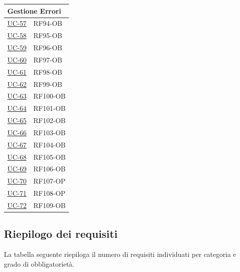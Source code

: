 ﻿\documentclass[a4paper,12pt]{article}
\begin{document}
{\begin{longtable}{|p{4cm}|p{4cm}|}
    \multicolumn{2}{|l|}{\cellcolor{gray!12}\textbf{Gestione Errori}} \\
    \hline
    \hyperref[errore-uc-57]{UC-57} & RF94-OB \\
    \hline
    \hyperref[errore-uc-58]{UC-58} & RF95-OB \\
    \hline
    \hyperref[errore-uc-59]{UC-59} & RF96-OB \\
    \hline
    \hyperref[errore-uc-60]{UC-60} & RF97-OB \\
    \hline
    \hyperref[errore-uc-61]{UC-61} & RF98-OB \\
    \hline
    \hyperref[errore-uc-62]{UC-62} & RF99-OB \\
    \hline
    \hyperref[errore-uc-63]{UC-63} & RF100-OB \\
    \hline
    \hyperref[errore-uc-64]{UC-64} & RF101-OB \\
    \hline
    \hyperref[errore-uc-65]{UC-65} & RF102-OB \\
    \hline
    \hyperref[errore-uc-66]{UC-66} & RF103-OB \\
    \hline
    \hyperref[errore-uc-67]{UC-67} & RF104-OB \\
    \hline
    \hyperref[errore-uc-68]{UC-68} & RF105-OB \\
    \hline
    \hyperref[errore-uc-69]{UC-69} & RF106-OB \\
    \hline
    \hyperref[errore-uc-70]{UC-70} & RF107-OP \\
    \hline
    \hyperref[errore-uc-71]{UC-71} & RF108-OP \\
    \hline
    \hyperref[errore-uc-72]{UC-72} & RF109-OB \\
    \hline

\end{longtable}
}

\subsection{Riepilogo dei requisiti}

La tabella seguente riepiloga il numero di requisiti individuati per categoria e grado di obbligatorietà.
\end{document}
